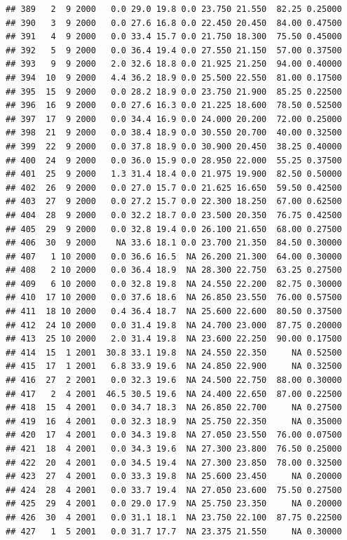 \documentclass[
]{book}
\begin{document}
\begin{verbatim}
## 389   2  9 2000   0.0 29.0 19.8 0.0 23.750 21.550  82.25 0.25000
## 390   3  9 2000   0.0 27.6 16.8 0.0 22.450 20.450  84.00 0.47500
## 391   4  9 2000   0.0 33.4 15.7 0.0 21.750 18.300  75.50 0.45000
## 392   5  9 2000   0.0 36.4 19.4 0.0 27.550 21.150  57.00 0.37500
## 393   9  9 2000   2.0 32.6 18.8 0.0 21.925 21.250  94.00 0.40000
## 394  10  9 2000   4.4 36.2 18.9 0.0 25.500 22.550  81.00 0.17500
## 395  15  9 2000   0.0 28.2 18.9 0.0 23.750 21.900  85.25 0.22500
## 396  16  9 2000   0.0 27.6 16.3 0.0 21.225 18.600  78.50 0.52500
## 397  17  9 2000   0.0 34.4 16.9 0.0 24.000 20.200  72.00 0.25000
## 398  21  9 2000   0.0 38.4 18.9 0.0 30.550 20.700  40.00 0.32500
## 399  22  9 2000   0.0 37.8 18.9 0.0 30.900 20.450  38.25 0.40000
## 400  24  9 2000   0.0 36.0 15.9 0.0 28.950 22.000  55.25 0.37500
## 401  25  9 2000   1.3 31.4 18.4 0.0 21.975 19.900  82.50 0.50000
## 402  26  9 2000   0.0 27.0 15.7 0.0 21.625 16.650  59.50 0.42500
## 403  27  9 2000   0.0 27.2 15.7 0.0 22.300 18.250  67.00 0.62500
## 404  28  9 2000   0.0 32.2 18.7 0.0 23.500 20.350  76.75 0.42500
## 405  29  9 2000   0.0 32.8 19.4 0.0 26.100 21.650  68.00 0.27500
## 406  30  9 2000    NA 33.6 18.1 0.0 23.700 21.350  84.50 0.30000
## 407   1 10 2000   0.0 36.6 16.5  NA 26.200 21.300  64.00 0.30000
## 408   2 10 2000   0.0 36.4 18.9  NA 28.300 22.750  63.25 0.27500
## 409   6 10 2000   0.0 32.8 19.8  NA 24.550 22.200  82.75 0.30000
## 410  17 10 2000   0.0 37.6 18.6  NA 26.850 23.550  76.00 0.57500
## 411  18 10 2000   0.4 36.4 18.7  NA 25.600 22.600  80.50 0.37500
## 412  24 10 2000   0.0 31.4 19.8  NA 24.700 23.000  87.75 0.20000
## 413  25 10 2000   2.0 31.4 19.8  NA 23.600 22.250  90.00 0.17500
## 414  15  1 2001  30.8 33.1 19.8  NA 24.550 22.350     NA 0.52500
## 415  17  1 2001   6.8 33.9 19.6  NA 24.850 22.900     NA 0.32500
## 416  27  2 2001   0.0 32.3 19.6  NA 24.500 22.750  88.00 0.30000
## 417   2  4 2001  46.5 30.5 19.6  NA 24.400 22.650  87.00 0.22500
## 418  15  4 2001   0.0 34.7 18.3  NA 26.850 22.700     NA 0.27500
## 419  16  4 2001   0.0 32.3 18.9  NA 25.750 22.350     NA 0.35000
## 420  17  4 2001   0.0 34.3 19.8  NA 27.050 23.550  76.00 0.07500
## 421  18  4 2001   0.0 34.3 19.6  NA 27.300 23.800  76.50 0.25000
## 422  20  4 2001   0.0 34.5 19.4  NA 27.300 23.850  78.00 0.32500
## 423  27  4 2001   0.0 33.3 19.8  NA 25.600 23.450     NA 0.20000
## 424  28  4 2001   0.0 33.7 19.4  NA 27.050 23.600  75.50 0.27500
## 425  29  4 2001   0.0 29.0 17.9  NA 25.750 23.350     NA 0.20000
## 426  30  4 2001   0.0 31.1 18.1  NA 23.750 22.100  87.75 0.22500
## 427   1  5 2001   0.0 31.7 17.7  NA 23.375 21.550     NA 0.30000

\end{verbatim}
\end{document}
